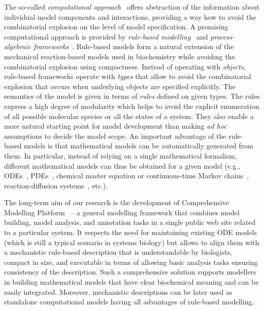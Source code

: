 \documentclass[11pt,a4paper]{report}
\begin{document}
The so-called \emph{computational approach}~\cite{Cardelli,Henzinger} offers abstraction of the information about individual model components and interactions, providing a way how to avoid the combinatorial explosion on the level of model specification. A promising computational approach is provided by \emph{rule-based modelling}~\cite{kappa_formal,harris2016bionetgen} and \emph{process-algebraic frameworks}~\cite{Cardelli,BioPEPA,BioSPI}. Rule-based models form a natural extension of the mechanical reaction-based models used in biochemistry while avoiding the combinatorial explosion using compactness. Instead of operating with \emph{objects}, rule-based frameworks operate with \emph{types} that allow to avoid the combinatorial explosion that occurs when underlying objects are specified explicitly. The semantics of the model is given in terms of \emph{rules} defined on given types. The rules express a high degree of modularity which helps to avoid the explicit enumeration of all possible molecular species or all the states of a system. They also enable a more natural starting point for model development than making \emph{ad hoc} assumptions to decide the model scope. An important advantage of the rule-based models is that mathematical models can be automatically generated from them. In particular, instead of relying on a single mathematical formalism, different mathematical models can thus be obtained for a given model (e.g., ODEs~\cite{camporesi2017k}, PDEs~\cite{andrews2016smoldyn}, chemical master equation or continuous-time Markov chains~\cite{pauleve2010generic,sneddon2011efficient}, reaction-diffusion systems~\cite{sorokina2013simulator}, etc.). 

The long-term aim of our research is the development of Comprehensive Modelling Platform~\cite{BCS,klement2013comprehensive} -- a general modelling framework that combines model building, model analysis, and annotation tasks in a single public web site related to a particular system. It respects the need for maintaining existing ODE models (which is still a typical scenario in systems biology) but allows to align them with a mechanistic rule-based description that is understandable by biologists, compact in size, and executable in terms of allowing basic analysis tasks ensuring consistency of the description. Such a comprehensive solution supports modellers in building mathematical models that have clear biochemical meaning and can be easily integrated. Moreover, mechanistic descriptions can be later used as standalone computational models having all advantages of rule-based modelling. 
\end{document}
